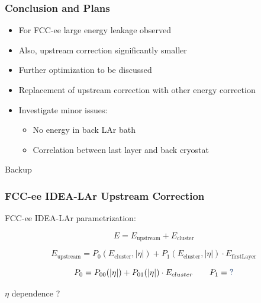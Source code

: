 \documentclass{beamer}
\newcommand{\backupbegin}{%
   \newcounter{finalframe}
   \setcounter{finalframe}{\value{framenumber}}
}
\newcommand{\bluetext}[1]{%
  \textcolor{myBlue}{#1}
}
\newcommand{\redtext}[1]{%
  \textcolor{myRed}{#1}
}
\begin{document}
\begin{frame}
  \frametitle{Conclusion and Plans}

  \begin{itemize}
    \item For FCC-ee large energy leakage observed
    \item Also, upstream correction significantly smaller
    \item Further optimization to be discussed
    \item Replacement of upstream correction with other energy correction
    \item Investigate minor issues:
          \begin{itemize}
            \item No energy in back LAr bath
            \item Correlation between last layer and back cryostat
          \end{itemize}
  \end{itemize}
\end{frame}


\appendix
\backupbegin{}

\begin{frame}[c]
  \begin{center}
    \redtext{\Huge Backup}
  \end{center}
\end{frame}


\begin{frame}
  \frametitle{FCC-ee IDEA-LAr Upstream Correction}

  \redtext{FCC-ee} IDEA-LAr parametrization:

  \begin{equation*}
    E = E_\text{upstream} + E_\text{cluster}
  \end{equation*}

  \begin{equation*}
  E_\text{upstream} = P_0(E_\text{cluster}, |\eta|) +
                      P_1(E_\text{cluster}, |\eta|) \cdot E_\text{firstLayer}
  \end{equation*}

  \begin{equation*}
    P_0 = P_{00}(|\eta|) + P_{01}(|\eta|) \cdot E_{cluster}  \qquad
    P_1 = \bluetext{?}
  \end{equation*}

  \begin{center}
    $\eta$ dependence \bluetext{?}
  \end{center}
\end{frame}
\end{document}
